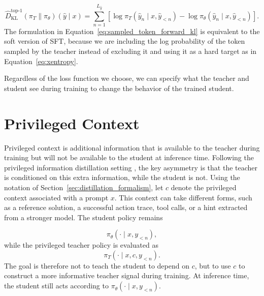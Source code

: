 \begin{equation}
\widehat{D}_{\mathrm{KL}}^{\mathrm{top}\mbox{-}1}
(\pi_T \| \pi_\theta)(\hat{y} \mid x)
= \sum_{n=1}^{L_{\hat{y}}}
\left[
\log \pi_T(\hat{y}_n \mid x, \hat{y}_{<n})
- \log \pi_\theta(\hat{y}_n \mid x, \hat{y}_{<n})
\right].
\label{eq:sampled_token_forward_kl}
\end{equation}
%
The formulation in Equation~\ref{eq:sampled_token_forward_kl} is equivalent to the soft version of SFT, because we are including the log probability of the token sampled by the teacher instead of excluding it and using it as a hard target as in Equation~\ref{eq:xentropy}.

Regardless of the loss function we choose, we can specify what the teacher and student see during training to change the behavior of the trained student.

\section{Privileged Context} \label{sec: methods_pc}

Privileged context is additional information that is available to the teacher during training but will not be available to the student at inference time. Following the privileged information distillation setting  \cite{shenfeldSelfDistillationEnablesContinual2026, hubotterReinforcementLearningSelfDistillation2026, penalozaPrivilegedInformationDistillation2026, zhaoSelfDistilledReasonerOnPolicy2026}, the key asymmetry is that the teacher is conditioned on this extra information, while the student is not. Using the notation of Section~\ref{sec:distillation_formalism}, let $c$ denote the privileged context associated with a prompt $x$. This context can take different forms, such as a reference solution, a successful action trace, tool calls, or a hint extracted from a stronger model. The student policy remains

\begin{equation}
\pi_\theta(\cdot \mid x, y_{<n}),
\end{equation}
%
while the privileged teacher policy is evaluated as
%
\begin{equation}
\pi_T(\cdot \mid x, c, y_{<n}).
\end{equation}
%
The goal is therefore not to teach the student to depend on $c$, but to use $c$ to construct a more informative teacher signal during training. At inference time, the student still acts according to $\pi_\theta(\cdot \mid x, y_{<n})$.

